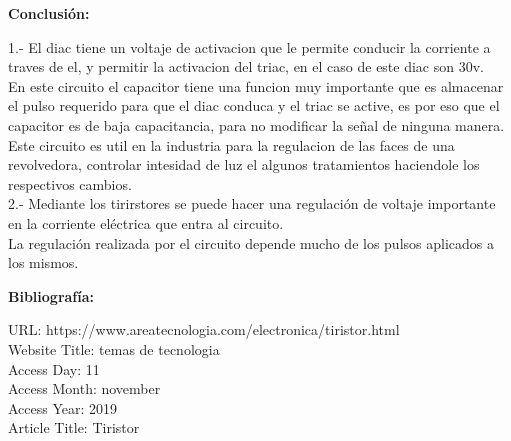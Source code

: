 \documentclass[letterpaper]{article}
\begin{document}
\begin{LARGE}
\textbf{Conclusión:}\\
\end{LARGE}
\begin{large}
  1.-  El diac tiene un voltaje de activacion que le permite conducir la corriente a traves de el, y permitir la activacion del triac, en el caso de este diac son 30v.\\
    En este circuito el capacitor tiene una funcion muy importante que es almacenar el pulso requerido para que el diac conduca y el triac se active, es por eso que el capacitor es de baja capacitancia, para no modificar la señal de ninguna manera.\\
    Este circuito es util en la industria para la regulacion de las faces de una revolvedora, controlar intesidad de luz el algunos tratamientos haciendole los respectivos cambios.\\
2.- Mediante los tirirstores se puede hacer una regulación de voltaje importante en la corriente eléctrica que entra al circuito.\\
    La regulación realizada por el circuito depende mucho de los pulsos aplicados a los mismos.\\
\end{large}





\begin{LARGE}
\textbf{Bibliografía:}\\
\end{LARGE}
    URL: https://www.areatecnologia.com/electronica/tiristor.html\\
    Website Title: temas de tecnologia\\
    Access Day: 11\\
    Access Month: november\\
    Access Year: 2019\\
    Article Title: Tiristor\\
\end{document}
